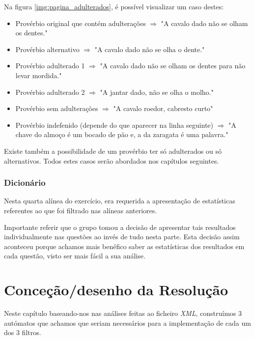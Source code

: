 \documentclass[11pt,a4paper]{report}
\begin{document}
\vspace{0.2cm}

Na figura \ref{img:pagina_adulterados}, é possível visualizar um caso destes:

\begin{itemize}
\item Provérbio original que contém adulterações $\Rightarrow$ "A cavalo dado não se olham os dentes."
\item Provérbio alternativo $\Rightarrow$ "A cavalo dado não se olha o dente."
\item Provérbio adulterado 1 $\Rightarrow$ "A cavalo dado não se olham os dentes para não levar mordida."
\item Provérbio adulterado 2 $\Rightarrow$ "A jantar dado, não se olha o molho."
\item Provérbio sem adulterações $\Rightarrow$ "A cavalo roedor, cabresto curto"
\item Provérbio indefenido (depende do que aparecer na linha seguinte) $\Rightarrow$ "A chave do almoço é um bocado de pão e, a da zaragata é uma palavra."
\end{itemize}

\vspace{0.2cm}

Existe também a possibilidade de um provérbio ter só adulterados ou só alternativos. Todos estes casos serão abordados nos capítulos seguintes.

\subsection{Dicionário}

Nesta quarta alínea do exercício, era requerida a apresentação de estatísticas referentes ao que foi filtrado nas alíneas anteriores.

Importante referir que o grupo tomou a decisão de apresentar tais resultados individualmente nas questões ao invés de tudo nesta parte. Esta decisão assim aconteceu porque achamos mais benéfico saber as estatísticas dos resultados em cada questão, visto ser mais fácil a sua análise.



\chapter{Conceção/desenho da Resolução}
\label{chap:concecao}

Neste capítulo baseando-nos nas análises feitas ao ficheiro \emph{XML}, construímos 3 autómatos que achamos que seriam necessários para a implementação de cada um dos 3 filtros.
\end{document}
